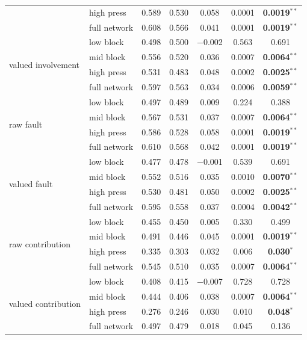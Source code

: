\begin{table}[H]
\begin{tabular}{llccccc}
 & high press   & 0.589 & 0.530 & 0.058 & 0.0001 & \textbf{0.0019}$^{**}$ \\
 & full network & 0.608 & 0.566 & 0.041 & 0.0001 & \textbf{0.0019}$^{**}$ \\
\midrule
\multirow{4}{*}{valued involvement}
 & low block    & 0.498 & 0.500 & $-$0.002 & 0.563 & 0.691 \\
 & mid block    & 0.556 & 0.520 & 0.036 & 0.0007 & \textbf{0.0064}$^{**}$ \\
 & high press   & 0.531 & 0.483 & 0.048 & 0.0002 & \textbf{0.0025}$^{**}$ \\
 & full network & 0.597 & 0.563 & 0.034 & 0.0006 & \textbf{0.0059}$^{**}$ \\
\midrule
\multirow{4}{*}{raw fault}
 & low block    & 0.497 & 0.489 & 0.009 & 0.224 & 0.388 \\
 & mid block    & 0.567 & 0.531 & 0.037 & 0.0007 & \textbf{0.0064}$^{**}$ \\
 & high press   & 0.586 & 0.528 & 0.058 & 0.0001 & \textbf{0.0019}$^{**}$ \\
 & full network & 0.610 & 0.568 & 0.042 & 0.0001 & \textbf{0.0019}$^{**}$ \\
\midrule
\multirow{4}{*}{valued fault}
 & low block    & 0.477 & 0.478 & $-$0.001 & 0.539 & 0.691 \\
 & mid block    & 0.552 & 0.516 & 0.035 & 0.0010 & \textbf{0.0070}$^{**}$ \\
 & high press   & 0.530 & 0.481 & 0.050 & 0.0002 & \textbf{0.0025}$^{**}$ \\
 & full network & 0.595 & 0.558 & 0.037 & 0.0004 & \textbf{0.0042}$^{**}$ \\
\midrule
\multirow{4}{*}{raw contribution}
 & low block    & 0.455 & 0.450 & 0.005 & 0.330 & 0.499 \\
 & mid block    & 0.491 & 0.446 & 0.045 & 0.0001 & \textbf{0.0019}$^{**}$ \\
 & high press   & 0.335 & 0.303 & 0.032 & 0.006 & \textbf{0.030}$^{*}$ \\
 & full network & 0.545 & 0.510 & 0.035 & 0.0007 & \textbf{0.0064}$^{**}$ \\
\midrule
\multirow{4}{*}{valued contribution}
 & low block    & 0.408 & 0.415 & $-$0.007 & 0.728 & 0.728 \\
 & mid block    & 0.444 & 0.406 & 0.038 & 0.0007 & \textbf{0.0064}$^{**}$ \\
 & high press   & 0.276 & 0.246 & 0.030 & 0.010 & \textbf{0.048}$^{*}$ \\
 & full network & 0.497 & 0.479 & 0.018 & 0.045 & 0.136 \\
\bottomrule
\end{tabular}
\end{table}


